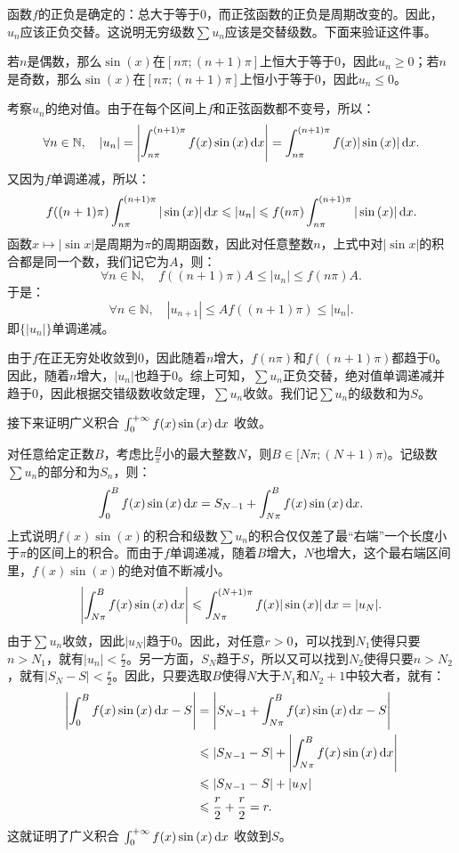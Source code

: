 \documentclass[12pt,UTF8]{ctexbook}
\begin{document}
\begin{so}
    函数$f$的正负是确定的：总大于等于$0$，而正弦函数的正负是周期改变的。因此，$u_n$应该正负交替。这说明无穷级数$\sum u_n$应该是交替级数。下面来验证这件事。

    若$n$是偶数，那么$\sin{(x)}$在$[n\pi;(n+1)\pi]$上恒大于等于$0$，因此$u_n\geqslant 0$；若$n$是奇数，那么$\sin{(x)}$在$[n\pi;(n+1)\pi]$上恒小于等于$0$，因此$u_n\leqslant 0$。

    考察$u_n$的绝对值。由于在每个区间上$f$和正弦函数都不变号，所以：
    $$ \forall n\in \mathbb{N},\quad |u_n| = \left|\int_{n\pi}^{(n+1)\pi} f(x) \sin{(x)} \,\mathrm{d}x\right| = \int_{n\pi}^{(n+1)\pi} f(x) |\sin{(x)}| \,\mathrm{d}x. $$
    又因为$f$单调递减，所以：
    $$ f((n+1)\pi)\int_{n\pi}^{(n+1)\pi} |\sin{(x)}| \,\mathrm{d}x \leqslant |u_n| \leqslant f(n\pi)\int_{n\pi}^{(n+1)\pi} |\sin{(x)}| \,\mathrm{d}x. $$
    函数$x\mapsto |\sin{x}|$是周期为$\pi$的周期函数，因此对任意整数$n$，上式中对$|\sin{x}|$的积合都是同一个数，我们记它为$A$，则：
    $$ \forall n\in \mathbb{N},\quad f((n+1)\pi)A \leqslant |u_n| \leqslant f(n\pi)A. $$
    于是：
    $$ \forall n\in \mathbb{N},\quad |u_{n+1}| \leqslant A f((n+1)\pi) \leqslant |u_n|. $$
    即$\{|u_n|\}$单调递减。

    由于$f$在正无穷处收敛到$0$，因此随着$n$增大，$f(n\pi)$和$f((n+1)\pi)$都趋于$0$。因此，随着$n$增大，$|u_n|$也趋于$0$。综上可知，$\sum u_n$正负交替，绝对值单调递减并趋于$0$，因此根据交错级数收敛定理，$\sum u_n$收敛。我们记$\sum u_n$的级数和为$S$。

    接下来证明广义积合 $\int_0^{+\infty} f(x) \sin{(x)} \,\mathrm{d}x$ 收敛。

    对任意给定正数$B$，考虑比$\frac{B}{\pi}$小的最大整数$N$，则$B\in [N\pi;(N+1)\pi)$。记级数$\sum u_n$的部分和为$S_n$，则：
    $$ \int_0^{B} f(x) \sin{(x)} \,\mathrm{d}x = S_{N-1} + \int_{N\pi}^{B} f(x) \sin{(x)} \,\mathrm{d}x. $$
    上式说明$f(x) \sin{(x)}$的积合和级数$\sum u_n$的积合仅仅差了最“右端”一个长度小于$\pi$的区间上的积合。而由于$f$单调递减，随着$B$增大，$N$也增大，这个最右端区间里，$f(x) \sin{(x)}$的绝对值不断减小。
    $$ \left| \int_{N\pi}^{B} f(x) \sin{(x)} \,\mathrm{d}x \right| \leqslant \int_{N\pi}^{(N+1)\pi} f(x)| \sin{(x)}| \,\mathrm{d}x = |u_N|. $$
    由于$\sum u_n$收敛，因此$|u_N|$趋于$0$。因此，对任意$r>0$，可以找到$N_1$使得只要$n>N_1$，就有$|u_n| < \frac{r}{2}$。另一方面，$S_N$趋于$S$，所以又可以找到$N_2$使得只要$n>N_2$，就有$|S_N - S| < \frac{r}{2}$。因此，只要选取$B$使得$N$大于$N_1$和$N_2+1$中较大者，就有：
    \begin{align*}
        \left| \int_0^{B} f(x) \sin{(x)} \,\mathrm{d}x - S \right| &= \left| S_{N-1} + \int_{N\pi}^{B} f(x) \sin{(x)} \,\mathrm{d}x - S \right| \\
        &\leqslant |S_{N-1} - S| + \left| \int_{N\pi}^{B} f(x) \sin{(x)} \,\mathrm{d}x \right|\\
        &\leqslant |S_{N-1} - S| + |u_N| \\
        &\leqslant \frac{r}{2} + \frac{r}{2} = r.
    \end{align*}
    这就证明了广义积合 $\int_0^{+\infty} f(x) \sin{(x)} \,\mathrm{d}x$ 收敛到$S$。


\end{so}
\end{document}
